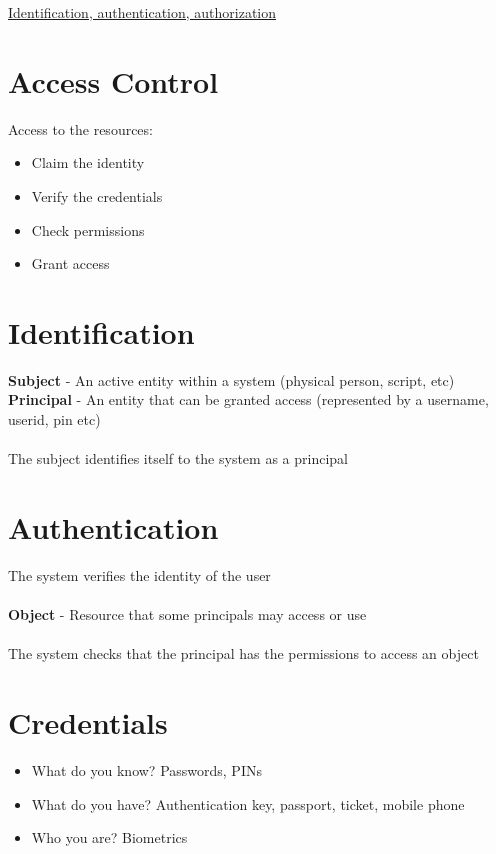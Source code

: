 \documentclass{article}[18pt]
\begin{document}
\begin{center}
\underline{\huge Identification, authentication, authorization}
\end{center}
\section{Access Control}
Access to the resources:
\begin{itemize}
	\item Claim the identity
	\item Verify the credentials
	\item Check permissions
	\item Grant access
\end{itemize}
\section{Identification}
\textbf{Subject} - An active entity within a system (physical person, script, etc)\\
\textbf{Principal} - An entity that can be granted access (represented by a username, userid, pin etc)\\
\\
The subject identifies itself to the system as a principal
\section{Authentication}
The system verifies the identity of the user\\
\\
\textbf{Object} - Resource that some principals may access or use\\
\\
The system checks that the principal has the permissions to access an object
\section{Credentials}
\begin{itemize}
	\item What do you know? Passwords, PINs
	\item What do you have? Authentication key, passport, ticket, mobile phone
	\item Who you are? Biometrics
\end{itemize}
\end{document}

